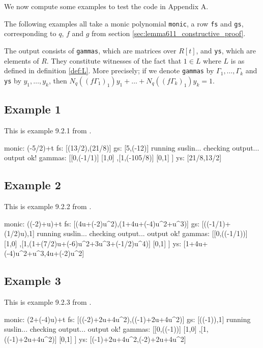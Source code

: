 We now compute some examples to test the code in Appendix A.

The following examples all take a monic polynomial \verb!monic!, a row \verb!fs! and \verb!gs!, corresponding to $q$, $f$ and $g$ from section \ref{sec:lemma611_constructive_proof}.

The output consists of \verb!gammas!, which are matrices over $R[t]$, and \verb!ys!, which are elements of $R$.
They constitute witnesses of the fact that $1 \in L$ where $L$ is as defined in definition \ref{def:L}.
More precisely; if we denote \verb!gammas! by $\Gamma_1, \dots, \Gamma_k$ and \verb!ys! by $y_1,\dots, y_k$, then
$N_q((f\Gamma_1)_1) y_1 + \dots + N_q((f\Gamma_k)_1) y_k = 1$.

\subsection{Example 1}

This is example 9.2.1 from \citep{fabianskaquadrat07}.

\begin{code}
monic: (-5/2)+t
fs: [(13/2),(21/8)]
gs: [5,(-12)]
running suslin...
checking output...
output ok!
gammas: 
[[0,(-1/1)]
[1,0]
,[1,(-105/8)]
[0,1]
]
ys: 
[21/8,13/2]
\end{code}




\subsection{Example 2}

This is example 9.2.2 from \citep{fabianskaquadrat07}.

\begin{code}
monic: ((-2)+u)+t
fs: [(4u+(-2)u^2),(1+4u+(-4)u^2+u^3)]
gs: [((-1/1)+(1/2)u),1]
running suslin...
checking output...
output ok!
gammas: 
[[0,((-1/1))]
[1,0]
,[1,(1+(7/2)u+(-6)u^2+3u^3+(-1/2)u^4)]
[0,1]
]
ys: 
[1+4u+(-4)u^2+u^3,4u+(-2)u^2]
\end{code}




\subsection{Example 3}

This is example 9.2.3 from \citep{fabianskaquadrat07}.

\begin{code}
monic: (2+(-4)u)+t
fs: [((-2)+2u+4u^2),((-1)+2u+4u^2)]
gs: [((-1)),1]
running suslin...
checking output...
output ok!
gammas: 
[[0,((-1))]
[1,0]
,[1,((-1)+2u+4u^2)]
[0,1]
]
ys: 
[(-1)+2u+4u^2,(-2)+2u+4u^2]
\end{code}


